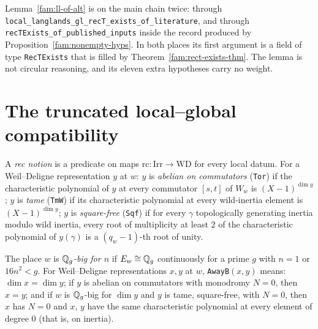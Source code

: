 \begin{remark}\label{fam:rem-identity}
Lemma~\ref{fam:ll-of-alt} is on the main chain twice: through \texttt{local\_langlands\_gl\_recT\_exists\_of\_literature}, and through \texttt{recTExists\_of\_published\_inputs} inside the record produced by Proposition~\ref{fam:nonempty-hyps}. In both places its first argument is a field of type \texttt{RecTExists} that is filled by Theorem~\ref{fam:rect-exists-thm}. The lemma is not circular reasoning, and its eleven extra hypotheses carry no weight.
\end{remark}

\section{The truncated local--global compatibility}

A \emph{rec notion} is a predicate on maps $\mathrm{rc}\colon\mathrm{Irr}\to\mathrm{WD}$ for every local datum. For a Weil--Deligne representation $y$ at $w$:
$y$ is \emph{abelian on commutators} (\texttt{Tor}) if the characteristic polynomial of $y$ at every commutator $[s,t]$ of $W_w$ is $(X-1)^{\dim y}$;
$y$ is \emph{tame} (\texttt{TmW}) if its characteristic polynomial at every wild-inertia element is $(X-1)^{\dim y}$;
$y$ is \emph{square-free} (\texttt{Sqf}) if for every $\gamma$ topologically generating inertia modulo wild inertia, every root of multiplicity at least $2$ of the characteristic polynomial of $y(\gamma)$ is a $(q_w-1)$-th root of unity.

\begin{definition}\label{fam:away-b}
The place $w$ is \emph{$\mathbb{Q}_g$-big for $n$} if $E_w\cong\mathbb{Q}_g$ continuously for a prime $g$ with $n=1$ or $16n^2<g$. For Weil--Deligne representations $x,y$ at $w$, \texttt{AwayB}$(x,y)$ means: $\dim x=\dim y$; if $y$ is abelian on commutators with monodromy $N=0$, then $x=y$; and if $w$ is $\mathbb{Q}_g$-big for $\dim y$ and $y$ is tame, square-free, with $N=0$, then $x$ has $N=0$ and $x$, $y$ have the same characteristic polynomial at every element of degree $0$ (that is, on inertia).
\end{definition}

